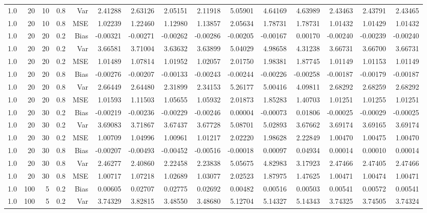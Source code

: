 \begin{table}[!htbp]
\begin{tabular}{lrrrrrrrrrrrrrr}
1.0 &  20 & 10 & 0.8 & Var & 2.41288 & 2.63126 & 2.05151 & 2.11918 & 5.05901 & 4.64169 & 4.63989 & 2.43463 & 2.43791 & 2.43465 \\
1.0 &  20 & 10 & 0.8 & MSE & 1.02239 & 1.22460 & 1.12980 & 1.13857 & 2.05634 & 1.78731 & 1.78731 & 1.01432 & 1.01429 & 1.01432 \\
1.0 &  20 & 20 & 0.2 & Bias & -0.00321 & -0.00271 & -0.00262 & -0.00286 & -0.00205 & -0.00167 & 0.00170 & -0.00240 & -0.00239 & -0.00240 \\
1.0 &  20 & 20 & 0.2 & Var & 3.66581 & 3.71004 & 3.63632 & 3.63899 & 5.04029 & 4.98658 & 4.31238 & 3.66731 & 3.66700 & 3.66731 \\
1.0 &  20 & 20 & 0.2 & MSE & 1.01489 & 1.07814 & 1.01952 & 1.02057 & 2.01750 & 1.98381 & 1.87745 & 1.01149 & 1.01153 & 1.01149 \\
1.0 &  20 & 20 & 0.8 & Bias & -0.00276 & -0.00207 & -0.00133 & -0.00243 & -0.00244 & -0.00226 & -0.00258 & -0.00187 & -0.00179 & -0.00187 \\
1.0 &  20 & 20 & 0.8 & Var & 2.66449 & 2.64480 & 2.31899 & 2.34153 & 5.26177 & 5.00416 & 4.09811 & 2.68292 & 2.68259 & 2.68292 \\
1.0 &  20 & 20 & 0.8 & MSE & 1.01593 & 1.11503 & 1.05655 & 1.05932 & 2.01873 & 1.85283 & 1.40703 & 1.01251 & 1.01255 & 1.01251 \\
1.0 &  20 & 30 & 0.2 & Bias & -0.00219 & -0.00236 & -0.00229 & -0.00246 & 0.00004 & -0.00073 & 0.01806 & -0.00025 & -0.00029 & -0.00025 \\
1.0 &  20 & 30 & 0.2 & Var & 3.69083 & 3.71867 & 3.67437 & 3.67728 & 5.08701 & 5.02893 & 3.67662 & 3.69174 & 3.69165 & 3.69174 \\
1.0 &  20 & 30 & 0.2 & MSE & 1.00709 & 1.04996 & 1.00961 & 1.01217 & 2.02220 & 1.98628 & 2.22849 & 1.00470 & 1.00475 & 1.00470 \\
1.0 &  20 & 30 & 0.8 & Bias & -0.00207 & -0.00493 & -0.00452 & -0.00516 & -0.00018 & 0.00097 & 0.04934 & 0.00014 & 0.00010 & 0.00014 \\
1.0 &  20 & 30 & 0.8 & Var & 2.46277 & 2.40860 & 2.22458 & 2.23838 & 5.05675 & 4.82983 & 3.17923 & 2.47466 & 2.47405 & 2.47466 \\
1.0 &  20 & 30 & 0.8 & MSE & 1.00717 & 1.07218 & 1.02689 & 1.03077 & 2.02523 & 1.87975 & 1.47625 & 1.00471 & 1.00474 & 1.00471 \\
1.0 & 100 &  5 & 0.2 & Bias & 0.00605 & 0.02707 & 0.02775 & 0.02692 & 0.00482 & 0.00516 & 0.00503 & 0.00541 & 0.00572 & 0.00541 \\
1.0 & 100 &  5 & 0.2 & Var & 3.74329 & 3.82815 & 3.48550 & 3.48680 & 5.12704 & 5.14327 & 5.14343 & 3.74325 & 3.74505 & 3.74324 \\

\end{tabular}
\end{table}
